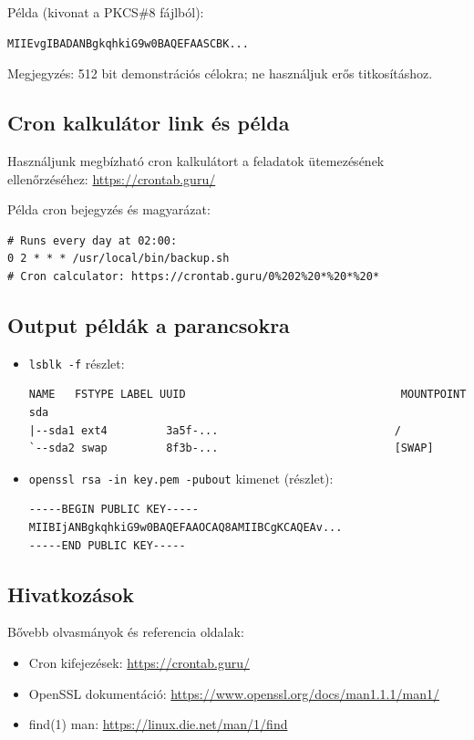 Példa (kivonat a PKCS\#8 fájlból):
\begin{verbatim}
MIIEvgIBADANBgkqhkiG9w0BAQEFAASCBK...
\end{verbatim}

Megjegyzés: 512 bit demonstrációs célokra; ne használjuk erős titkosításhoz.

\subsection{Cron kalkulátor link és példa}
Használjunk megbízható cron kalkulátort a feladatok ütemezésének ellenőrzéséhez: \url{https://crontab.guru/}

Példa cron bejegyzés és magyarázat:
\begin{lstlisting}
# Runs every day at 02:00:
0 2 * * * /usr/local/bin/backup.sh
# Cron calculator: https://crontab.guru/0%202%20*%20*%20*
\end{lstlisting}

\subsection{Output példák a parancsokra}
\begin{itemize}
  \item \texttt{lsblk -f} részlet:
\begin{verbatim}
NAME   FSTYPE LABEL UUID                                 MOUNTPOINT
sda                                                          
|--sda1 ext4         3a5f-...                           /
`--sda2 swap         8f3b-...                           [SWAP]
\end{verbatim}

  \item \texttt{openssl rsa -in key.pem -pubout} kimenet (részlet):
\begin{verbatim}
-----BEGIN PUBLIC KEY-----
MIIBIjANBgkqhkiG9w0BAQEFAAOCAQ8AMIIBCgKCAQEAv...
-----END PUBLIC KEY-----
\end{verbatim}

\end{itemize}

\subsection{Hivatkozások}
Bővebb olvasmányok és referencia oldalak:
\begin{itemize}
  \item Cron kifejezések: \url{https://crontab.guru/}
  \item OpenSSL dokumentáció: \url{https://www.openssl.org/docs/man1.1.1/man1/}
  \item find(1) man: \url{https://linux.die.net/man/1/find}
\end{itemize}
